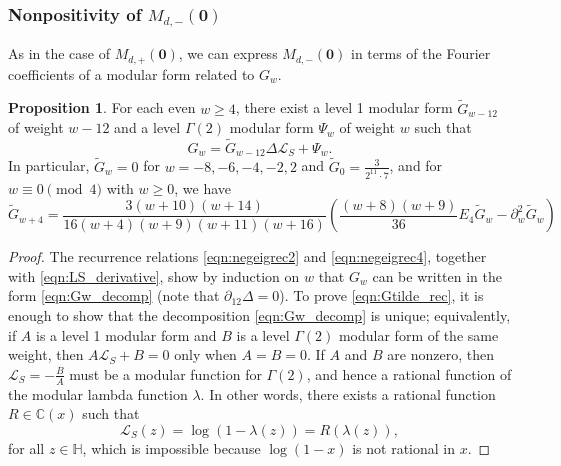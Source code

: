 \documentclass[10pt,reqno]{amsproc}
\newcommand{\bC}{\mathbb{C}}
\newcommand{\bH}{\mathbb{H}}
\newcommand{\cL}{\mathcal{L}}
\newcommand{\1}{\mathds{1}}	%
\theoremstyle{definition}
\newtheorem{proposition}[theorem]{Proposition}
\theoremstyle{remark}
\begin{document}
\subsubsection{Nonpositivity of $M_{d,-}(\mathbf{0})$}
\label{subsec:nonposorig_neg}

As in the case of $M_{d,+}(\mathbf{0})$, we can express $M_{d,-}(\mathbf{0})$ in terms of the Fourier coefficients of a modular form related to $G_{w}$.

\begin{proposition}
\label{prop:Gw_comp}
For each even $w \geq 4$, there exist a level 1 modular form $\widetilde{G}_{w-12}$ of weight $w-12$ and a level $\Gamma(2)$ modular form $\Psi_w$ of weight $w$ such that
\begin{equation}
    \label{eqn:Gw_decomp}
    G_w = \widetilde{G}_{w-12} \Delta \cL_S + \Psi_w.
\end{equation}
In particular, $\widetilde{G}_{w} = 0$ for $w = -8, -6, -4, -2, 2$ and $\widetilde{G}_{0} = \frac{3}{2^{11} \cdot 7}$, and for $w \equiv 0 \pmod{4}$ with $w \geq 0$, we have
\begin{equation}
    \label{eqn:Gtilde_rec}
    \widetilde{G}_{w+4} = \frac{3(w+10)(w+14)}{16(w+4)(w+9)(w+11)(w+16)} \left(\frac{(w+8)(w+9)}{36} E_4 \widetilde{G}_{w} - \partial_{w}^{2} \widetilde{G}_{w}\right)
\end{equation}
\end{proposition}
\begin{proof}
    The recurrence relations \eqref{eqn:negeigrec2} and \eqref{eqn:negeigrec4}, together with \eqref{eqn:LS_derivative}, show by induction on $w$ that $G_w$ can be written in the form \eqref{eqn:Gw_decomp} (note that $\partial_{12} \Delta = 0$).
    To prove \eqref{eqn:Gtilde_rec}, it is enough to show that the decomposition \eqref{eqn:Gw_decomp} is unique; equivalently, if $A$ is a level 1 modular form and $B$ is a level $\Gamma(2)$ modular form of the same weight, then $A \cL_S + B = 0$ only when $A=B=0$.
    If $A$ and $B$ are nonzero, then $\cL_S = -\frac{B}{A}$ must be a modular function for $\Gamma(2)$, and hence a rational function of the modular lambda function $\lambda$.
    In other words, there exists a rational function $R \in \bC(x)$ such that
    \[
    \cL_S(z) = \log (1 - \lambda(z)) = R(\lambda(z)),
    \]
    for all $z \in \bH$, which is impossible because $\log(1 - x)$ is not rational in $x$.
\end{proof}
\end{document}
